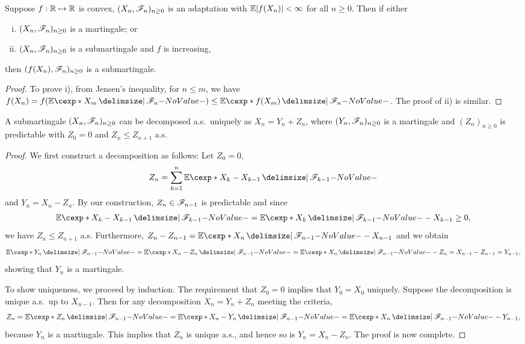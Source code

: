 \documentclass[12pt]{article}
\begin{document}
\begin{Lemma}\label{wk14:fnM}
Suppose $f : \mathbb{R} \mapsto \mathbb{R}$ is convex, $(X_n,\mathscr{F}_n)_{n\geq0}$ is an adaptation with $\E|f(X_n)| <\infty$ for all $n\geq0$. Then if either
\begin{enumerate}[i)]
	\item $(X_n,\mathscr{F}_n)_{n\geq0}$ is a martingale; or
	\item $(X_n,\mathscr{F}_n)_{n\geq0}$ is a submartingale and $f$ is increasing,
\end{enumerate}
then $(f(X_n),\mathscr{F}_n)_{n\geq0}$ is a submartingale.
\end{Lemma}
\begin{proof}
To prove i), from Jensen's inequality, for $n\leq m$, we have $f(X_n) = f(\E[X_m \given \scF_n]) \leq \E[f(X_m) \given \scF_n]$. The proof of ii) is similar.
\end{proof}

\begin{Theorem}\label{wk14:Doob's decomposition}
A submartingale $(X_n,\mathscr{F}_n)_{n\geq0}$ can be decomposed a.s.\ uniquely as $X_n = Y_n + Z_n$, where $(Y_n,\mathscr{F}_n)_{n\geq0}$ is a martingale and $(Z_n)_{n\geq0}$ is predictable with $Z_0=0$ and $Z_n\leq Z_{n+1}$ a.s.
\end{Theorem}
\begin{proof}
We first construct a decomposition as follows: Let $Z_0=0$, 
\begin{align*}
Z_n=\sum_{k=1}^n \E[X_k-X_{k-1} \given \scF_{k-1}]
\end{align*}
 and $Y_n=X_n-Z_n$. By our construction, $Z_n \in \mathscr{F}_{n-1}$ is predictable and since 
\begin{align*}
\E[X_k-X_{k-1} \given \scF_{k-1}] = \E[X_k \given \scF_{k-1}] - X_{k-1} \geq 0,
\end{align*}
we have $Z_n \leq Z_{n+1}$ a.s. Furthermore, $Z_n - Z_{n-1} = \E[X_n \given \scF_{n-1}] - X_{n-1}$ and we obtain
\begin{align*}
\E[Y_n \given \scF_{n-1}] = \E[X_n - Z_n \given \scF_{n-1}] = \E[X_n \given \scF_{n-1}] - Z_n = X_{n-1} - Z_{n-1}= Y_{n-1}, 
\end{align*}
showing that $Y_n$ is a martingale.

To show uniqueness, we proceed by induction. The requirement that $Z_0=0$ implies that $Y_0=X_0$ uniquely. Suppose the decomposition is unique a.s.\ up to $X_{n-1}$. Then for any decomposition $X_n = Y_n + Z_n$ meeting the criteria,
\begin{align*}
Z_n = \E[Z_n \given \scF_{n-1}] = \E[X_n - Y_n \given \scF_{n-1}] = \E[X_n \given \scF_{n-1}] - Y_{n-1}, 
\end{align*}
because $Y_n$ is a martingale. This implies that $Z_n$ is unique a.s., and hence so is $Y_n = X_n - Z_n$. The proof is now complete.
\end{proof}
\end{document}
